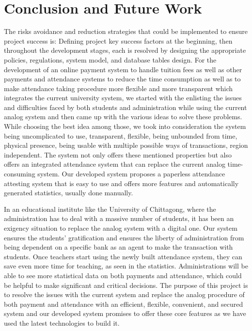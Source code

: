 \section{Conclusion and Future Work}\label{sec:cfw}
The risks avoidance and reduction strategies that could be implemented to ensure project success is: Defining project key success factors at the beginning, then throughout the development stages, each is resolved by designing the appropriate policies, regulations, system model, and database tables design. For the development of an online payment system to handle tuition fees as well as other payments and attendance systems to reduce the time consumption as well as to make attendance taking procedure more flexible and more transparent which integrates the current university system, we started with the enlisting the issues and difficulties faced by both students and administration while using the current analog system and then came up with the various ideas to solve these problems. While choosing the best idea among those, we took into consideration the system being uncomplicated to use, transparent, flexible, being unbounded from time, physical presence, being usable with multiple possible ways of transactions, region independent. The system not only offers these mentioned properties but also offers an integrated attendance system that can replace the current analog time-consuming system. Our developed system proposes a paperless attendance attesting system that is easy to use and offers more features and automatically generated statistics, usually done manually.

In an educational institute like the University of Chittagong, where the administration has to deal with a massive number of students, it has been an exigency situation to replace the analog system with a digital one. Our system ensures the students' gratification and ensures the liberty of administration from being dependent on a specific bank as an agent to make the transaction with students. Once teachers start using the newly built attendance system, they can save even more time for teaching, as seen in the statistics. Administrations will be able to see more statistical data on both payments and attendance, which could be helpful to make significant and critical decisions. The purpose of this project is to resolve the issues with the current system and replace the analog procedure of both payment and attendance with an efficient, flexible, convenient, and secured system and our developed system promises to offer these core features as we have used the latest technologies to build it.

